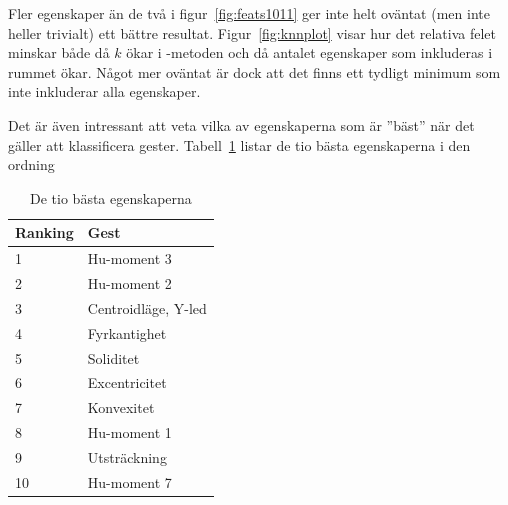 \documentclass[../rapport_MVEX01-11-05]{subfiles}
\begin{document}
Fler egenskaper än de två i figur~\ref{fig:feats1011} ger inte helt oväntat
(men inte heller trivialt) ett bättre resultat. Figur~\ref{fig:knnplot} visar
hur det relativa felet minskar både då $k$ ökar i \knn-metoden och då antalet
egenskaper som inkluderas i rummet ökar. Något mer oväntat är dock att det
finns ett tydligt minimum som inte inkluderar alla egenskaper.

Det är även intressant att veta vilka av egenskaperna som är ''bäst'' när det
gäller att klassificera gester. Tabell~\ref{tab:bestfeats} listar de tio bästa
egenskaperna i den ordning 

\begin{table}[htb]
	\centering
	\caption{De tio bästa egenskaperna}
	\label{tab:bestfeats}
	\begin{tabular}{ll}
		\toprule
		Ranking & Gest \\
		\midrule
		1 & Hu-moment 3 \\
		2 & Hu-moment 2 \\
		3 & Centroidläge, Y-led \\
		4 & Fyrkantighet \\
		5 & Soliditet \\
		6 & Excentricitet \\
		7 & Konvexitet \\
		8 & Hu-moment 1 \\
		9 & Utsträckning \\
		10 & Hu-moment 7 \\
		\bottomrule
	\end{tabular}
\end{table}
\end{document}
